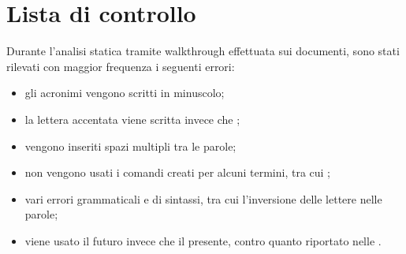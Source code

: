 \section{Lista di controllo}
Durante l'analisi statica tramite walkthrough effettuata sui documenti, sono stati rilevati con maggior frequenza i seguenti errori:
\begin{itemize}
	\item gli acronimi vengono scritti in minuscolo;
	\item la lettera  accentata viene scritta  invece che ;
	\item vengono inseriti spazi multipli tra le parole;
	\item non vengono usati i comandi creati per alcuni termini, tra cui \ProjectName{};
	\item vari errori grammaticali e di sintassi, tra cui l'inversione delle lettere nelle parole;
	\item viene usato il futuro invece che il presente, contro quanto riportato nelle \NormeDiProgetto{}.
\end{itemize}